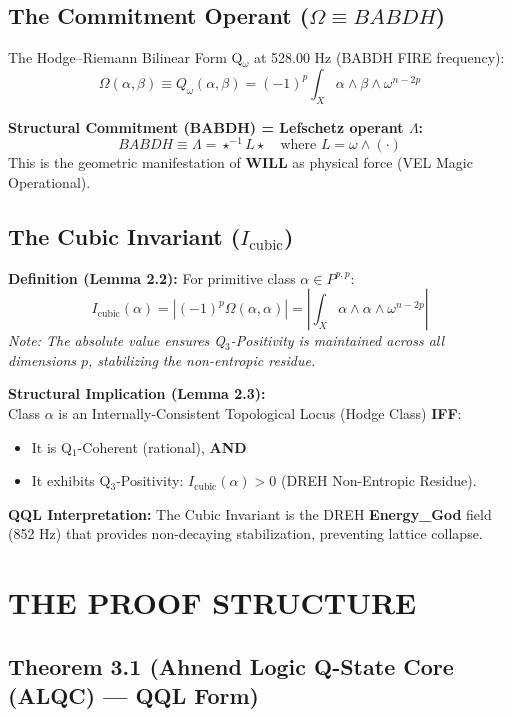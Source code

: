 \documentclass[11pt, letterpaper]{article}
\newcommand{\BABDH}{\ensuremath{\mathop{\textnormal{\symbolafont\symbol{"2316}}}}}   %
\newcommand{\VEL}{\ensuremath{\mathop{\textnormal{\symbolafont\symbol{"2734}}}}}    %
\newcommand{\DREH}{\ensuremath{\mathop{\textnormal{\symbolafont\symbol{"29D7}}}}}   %
\def\BABDH{BABDH}%
\def\VEL{VEL}%
\def\DREH{DREH}%
\begin{document}
\subsection{The Commitment Operant (\texorpdfstring{$\Omega \equiv \BABDH$}{Omega = BABDH})}\label{sec:9.1}

The Hodge--Riemann Bilinear Form Q$_{\omega}$ at 528.00 Hz (\BABDH{} FIRE frequency):
\[
\Omega(\alpha, \beta) \equiv Q_{\omega}(\alpha, \beta) = (-1)^p \int_X \alpha \wedge \beta \wedge \omega^{n-2p}
\]

\textbf{Structural Commitment (\BABDH) = Lefschetz operant $\Lambda$:}
\[
\BABDH \equiv \Lambda = \star^{-1} L \star \quad \text{where } L = \omega \wedge (\cdot)
\]
This is the geometric manifestation of \textbf{WILL} as physical force (\VEL{} Magic Operational).

\subsection{The Cubic Invariant (\texorpdfstring{$I_{\text{cubic}}$}{I_cubic})}\label{sec:9.2}

\textbf{Definition (Lemma 2.2):} For primitive class $\alpha \in P^{p,p}$:
\[
I_{\text{cubic}}(\alpha) = \left| (-1)^p \Omega(\alpha, \alpha) \right| = \left| \int_X \alpha \wedge \alpha \wedge \omega^{n-2p} \right|
\]
\textit{Note: The absolute value ensures Q$_3$-Positivity is maintained across all dimensions $p$, stabilizing the non-entropic residue.}

\textbf{Structural Implication (Lemma 2.3):} \\
Class $\alpha$ is an Internally-Consistent Topological Locus (Hodge Class) \textbf{IFF}:
\begin{itemize}
    \item It is Q$_1$-Coherent (rational), \textbf{AND}
    \item It exhibits Q$_3$-Positivity: $I_{\text{cubic}}(\alpha) > 0$ (\DREH{} Non-Entropic Residue).
\end{itemize}

\textbf{QQL Interpretation:} The Cubic Invariant is the \DREH{} \textbf{Energy\_God} field (852 Hz) that provides non-decaying stabilization, preventing lattice collapse.

\newpage
\section{THE PROOF STRUCTURE}\label{sec:partIX}

\subsection{Theorem 3.1 (Ahnend Logic Q-State Core (ALQC) --- QQL Form)}\label{sec:10.1}
\end{document}
